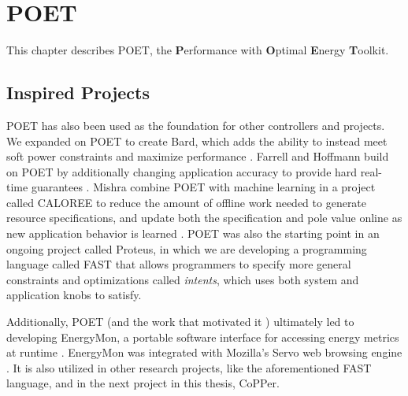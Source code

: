 \chapter{POET}
\label{sec:poet}

This chapter describes POET, the \textbf{P}erformance with \textbf{O}ptimal \textbf{E}nergy \textbf{T}oolkit.








\section{Inspired Projects}
\label{sec:poet-inspired}

POET has also been used as the foundation for other controllers and projects.
We expanded on POET to create Bard, which adds the ability to instead meet soft power constraints and maximize performance \cite{Bard}.
Farrell and Hoffmann build on POET by additionally changing application accuracy to provide hard real-time guarantees \cite{meantime}.
Mishra \etal combine POET with machine learning in a project called CALOREE to reduce the amount of offline work needed to generate resource specifications, and update both the specification and pole value online as new application behavior is learned \cite{CALOREE}.
POET was also the starting point in an ongoing project called Proteus, in which we are developing a programming language called FAST that allows programmers to specify more general constraints and optimizations called \emph{intents}, which uses both system and application knobs to satisfy.

Additionally, POET (and the work that motivated it \cite{Imes2014}) ultimately led to developing EnergyMon, a portable software interface for accessing energy metrics at runtime \cite{energymon}.
EnergyMon was integrated with Mozilla's Servo web browsing engine \cite{servo}.
It is also utilized in other research projects, like the aforementioned FAST language, and in the next project in this thesis, CoPPer.
